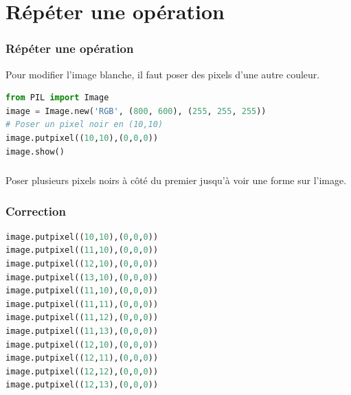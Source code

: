 \documentclass[svgnames,11pt]{beamer}
\begin{document}
\section{Répéter une opération}
\begin{frame}[fragile]
    \frametitle{Répéter une opération}

Pour modifier l'image blanche, il faut poser des pixels d'une autre couleur.
\begin{center}
\begin{lstlisting}[language=Python , basicstyle=\ttfamily\small, xleftmargin=0em, xrightmargin=0em]
from PIL import Image
image = Image.new('RGB', (800, 600), (255, 255, 255))
# Poser un pixel noir en (10,10)
image.putpixel((10,10),(0,0,0))
image.show()
\end{lstlisting}
\label{CODE}
\end{center}
\end{frame}
\begin{frame}
    \frametitle{}

    \begin{activite}
    Poser plusieurs pixels noirs à côté du premier jusqu'à voir une forme sur l'image.
    \end{activite}

\end{frame}
\begin{frame}[fragile]
    \frametitle{Correction}
\begin{center}
\begin{lstlisting}[language=Python , basicstyle=\ttfamily\small, xleftmargin=2em, xrightmargin=2em]
image.putpixel((10,10),(0,0,0))
image.putpixel((11,10),(0,0,0))
image.putpixel((12,10),(0,0,0))
image.putpixel((13,10),(0,0,0))
image.putpixel((11,10),(0,0,0))
image.putpixel((11,11),(0,0,0))
image.putpixel((11,12),(0,0,0))
image.putpixel((11,13),(0,0,0))
image.putpixel((12,10),(0,0,0))
image.putpixel((12,11),(0,0,0))
image.putpixel((12,12),(0,0,0))
image.putpixel((12,13),(0,0,0))
\end{lstlisting}
\label{CODE}
\end{center} 

\end{frame}
\end{document}

